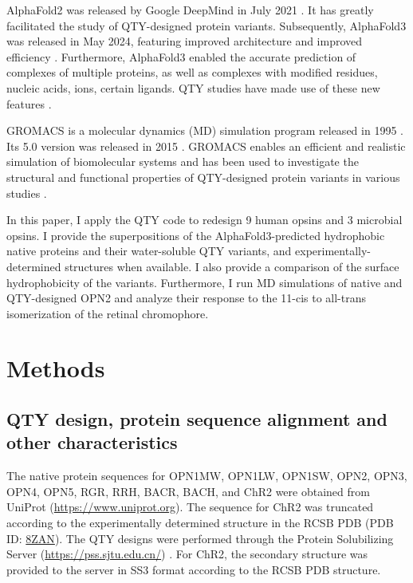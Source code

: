 \documentclass[fleqn, 10pt]{manuscript}
\begin{document}
AlphaFold2 was released by Google DeepMind in July 2021 \citep{Jumper_2021}. It has greatly facilitated the study of QTY-designed protein variants. Subsequently, AlphaFold3 was released in May 2024, featuring improved architecture and improved efficiency \citep{Abramson_2024}. Furthermore, AlphaFold3 enabled the accurate prediction of complexes of multiple proteins, as well as complexes with modified residues, nucleic acids, ions, certain ligands. QTY studies have made use of these new features \citep{Chen_2025, Johnsson_2025}. 

GROMACS is a molecular dynamics (MD) simulation program released in 1995 \citep{Berendsen_1995}. Its 5.0 version was released in 2015 \citep{Abraham_2015}. GROMACS enables an efficient and realistic simulation of biomolecular systems and has been used to investigate the structural and functional properties of QTY-designed protein variants in various studies \citep{Karagol_2024, Li_Tang_2024, Smorodina_2024, Li_Wang_2024, Johnsson_2025}. 

In this paper, I apply the QTY code to redesign 9 human opsins and 3 microbial opsins. I provide the superpositions of the AlphaFold3-predicted hydrophobic native proteins and their water-soluble QTY variants, and experimentally-determined structures when available. I also provide a comparison of the surface hydrophobicity of the variants. Furthermore, I run MD simulations of native and QTY-designed OPN2 and analyze their response to the 11-cis to all-trans isomerization of the retinal chromophore. 

\section*{Methods}

\subsection*{QTY design, protein sequence alignment and other characteristics}

The native protein sequences for OPN1MW, OPN1LW, OPN1SW, OPN2, OPN3, OPN4, OPN5, RGR, RRH, BACR, BACH, and ChR2 were obtained from UniProt (\url{https://www.uniprot.org}). The sequence for ChR2 was truncated according to the experimentally determined structure in the RCSB PDB (PDB ID: \href{https://www.rcsb.org/structure/8ZAN}{8ZAN}). The QTY designs were performed through the Protein Solubilizing Server (\url{https://pss.sjtu.edu.cn/}) \citep{Tao_2022}. For ChR2, the secondary structure was provided to the server in SS3 format according to the RCSB PDB structure. 
\end{document}
